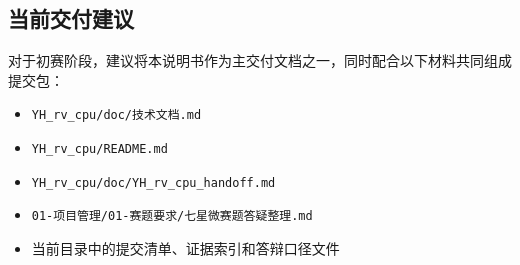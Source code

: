 \subsection{当前交付建议}

对于初赛阶段，建议将本说明书作为主交付文档之一，同时配合以下材料共同组成提交包：

\begin{itemize}
    \item \texttt{YH\_rv\_cpu/doc/技术文档.md}
    \item \texttt{YH\_rv\_cpu/README.md}
    \item \texttt{YH\_rv\_cpu/doc/YH\_rv\_cpu\_handoff.md}
    \item \texttt{01-项目管理/01-赛题要求/七星微赛题答疑整理.md}
    \item 当前目录中的提交清单、证据索引和答辩口径文件
\end{itemize}

\clearpage
